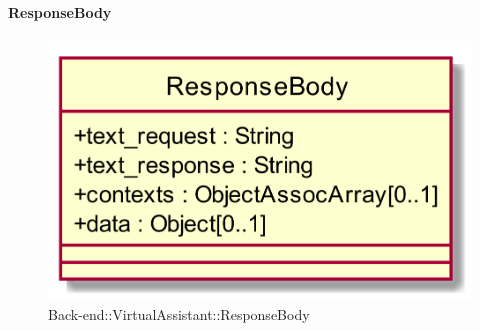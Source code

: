 \hypertarget{ResponseBody_label}{\paragraph{ResponseBody}}
\begin{figure}[h]
	\centering
	\includegraphics[width=\textwidth,height=\textheight,keepaspectratio]{images/ClassResponseBody.png}
	\caption{Back-end::VirtualAssistant::ResponseBody}
\end{figure}
